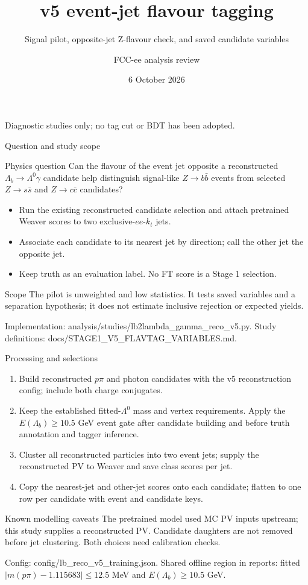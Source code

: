 \documentclass[aspectratio=169,10pt]{beamer}
\title[v5 flavour-tagging pilot]{v5 event-jet flavour tagging}
\subtitle{Signal pilot, opposite-jet Z-flavour check, and saved candidate variables}
\author{FCC-ee analysis review}
\date{6 October 2026}
\newcommand{\tinyref}[1]{\vfill\par{\tiny\color{gray}#1}}
\begin{document}
\begin{frame}
  \titlepage
  \vspace{-0.4cm}
  \begin{center}\small Diagnostic studies only; no tag cut or BDT has been adopted.\end{center}
\end{frame}

\begin{frame}{Question and study scope}
\begin{block}{Physics question}
Can the flavour of the event jet opposite a reconstructed $\Lambda_b\to\Lambda^0\gamma$ candidate help distinguish signal-like $Z\to b\bar b$ events from selected $Z\to s\bar s$ and $Z\to c\bar c$ candidates?
\end{block}
\begin{itemize}
  \item Run the existing reconstructed candidate selection and attach pretrained Weaver scores to two exclusive-$ee$-$k_t$ jets.
  \item Associate each candidate to its nearest jet by direction; call the other jet the opposite jet.
  \item Keep truth as an evaluation label. No FT score is a Stage 1 selection.
\end{itemize}
\begin{alertblock}{Scope}
The pilot is unweighted and low statistics. It tests saved variables and a separation hypothesis; it does not estimate inclusive rejection or expected yields.
\end{alertblock}
\tinyref{Implementation: analysis/studies/lb2lambda\_gamma\_reco\_v5.py. Study definitions: docs/STAGE1\_V5\_FLAVTAG\_VARIABLES.md.}
\end{frame}

\begin{frame}{Processing and selections}
\small
\begin{enumerate}
  \item Build reconstructed $p\pi$ and photon candidates with the v5 reconstruction config; include both charge conjugates.
  \item Keep the established fitted-$\Lambda^0$ mass and vertex requirements. Apply the $E(\Lambda_b)\geq10.5$ GeV event gate after candidate building and before truth annotation and tagger inference.
  \item Cluster all reconstructed particles into two event jets; supply the reconstructed PV to Weaver and save class scores per jet.
  \item Copy the nearest-jet and other-jet scores onto each candidate; flatten to one row per candidate with event and candidate keys.
\end{enumerate}
\begin{block}{Known modelling caveats}
The pretrained model used MC PV inputs upstream; this study supplies a reconstructed PV. Candidate daughters are not removed before jet clustering. Both choices need calibration checks.
\end{block}
\tinyref{Config: config/lb\_reco\_v5\_training.json. Shared offline region in reports: fitted $|m(p\pi)-1.115683|\leq12.5$ MeV and $E(\Lambda_b)\geq10.5$ GeV.}
\end{frame}
\end{document}
